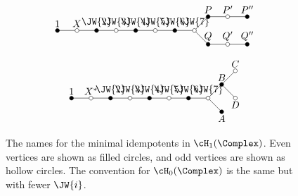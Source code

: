 \begin{figure}[!htb]
$$\begin{tikzpicture}[baseline=-1mm, scale=.7]
	\draw (0,0) -- (7,0);
	\draw (7,0)--(7.7,.7)--(9.7,.7);
	\draw (7,0)--(7.7,-.7)--(9.7,-.7);

	\filldraw              (0,0) node [above] {$1$} circle (1mm);
	\filldraw [fill=white] (1,0) node [above] {$X$} circle (1mm);
	\filldraw              (2,0) node [above] {$\JW{2}$}  circle (1mm);
	\filldraw [fill=white] (3,0) node [above] {$\JW{3}$}  circle (1mm);
	\filldraw              (4,0) node [above] {$\JW{4}$}  circle (1mm);
	\filldraw [fill=white] (5,0) node [above] {$\JW{5}$}  circle (1mm);
	\filldraw              (6,0) node [above] {$\JW{6}$}  circle (1mm);
	\filldraw [fill=white] (7,0) node [above] {$\JW{7}$}  circle (1mm);
	
	
	\filldraw              (7.7,.7) node [above] {$P$}  circle (1mm);
	\filldraw [fill=white] (8.7,.7) node [above] {$P'$}  circle (1mm);
	\filldraw              (9.7,.7) node [above] {$P''$}  circle (1mm);
	\filldraw              (7.7,-.7) node [above] {$Q$}  circle (1mm);
	\filldraw [fill=white] (8.7,-.7) node [above] {$Q'$}  circle (1mm);
	\filldraw              (9.7,-.7) node [above] {$Q''$}  circle (1mm);
\end{tikzpicture}$$

$$\begin{tikzpicture}[baseline=-1mm, scale=.7]
	\draw (0,0) -- (7,0);
	\draw (7,0)--(7.7,.7);
	\draw (7,0)--(7.7,-.7);
	\draw (7.7,.7)--(8.4,1.4);
	\draw (7.7,.7)--(8.4,0);

	\filldraw              (0,0) node [above] {$1$} circle (1mm);
	\filldraw [fill=white] (1,0) node [above] {$X^*$} circle (1mm);
	\filldraw              (2,0) node [above] {$\JW{2}$}  circle (1mm);
	\filldraw [fill=white] (3,0) node [above] {$\JW{3}$}  circle (1mm);
	\filldraw              (4,0) node [above] {$\JW{4}$}  circle (1mm);
	\filldraw [fill=white] (5,0) node [above] {$\JW{5}$}  circle (1mm);
	\filldraw              (6,0) node [above] {$\JW{6}$}  circle (1mm);
	\filldraw [fill=white] (7,0) node [above] {$\JW{7}$}  circle (1mm);
	
	
	\filldraw              (7.7,.7) node [above] {$B$}  circle (1mm);
	\filldraw              (7.7,-.7) node [below] {$A$}  circle (1mm);
	\filldraw [fill=white] (8.4,1.4) node [above] {$C$}  circle (1mm);
	\filldraw [fill=white] (8.4,0) node [below] {$D$}  circle (1mm);
\end{tikzpicture}$$
\caption{The names for the minimal idempotents in $\cH_1(\Complex)$. Even vertices are shown as filled circles, and odd vertices are shown as hollow circles.  The convention for $\cH_0(\Complex)$ is the same but with fewer $\JW{i}$.}
\label{fig:naming}
\end{figure}

